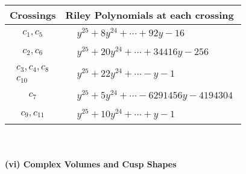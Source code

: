 \documentclass[1p]{elsarticle_modified}
\theoremstyle{definition}
\begin{document}
\begin{tabular}{m{50pt}|m{274pt}}
Crossings & \hspace{64pt}Riley Polynomials at each crossing \\
\hline $$\begin{aligned}c_{1},c_{5}\end{aligned}$$&$\begin{aligned}
&y^{25}+8 y^{24}+\cdots+92 y-16
\end{aligned}$\\
\hline $$\begin{aligned}c_{2},c_{6}\end{aligned}$$&$\begin{aligned}
&y^{25}+20 y^{24}+\cdots+34416 y-256
\end{aligned}$\\
\hline $$\begin{aligned}c_{3},c_{4},c_{8}\\c_{10}\end{aligned}$$&$\begin{aligned}
&y^{25}+22 y^{24}+\cdots- y-1
\end{aligned}$\\
\hline $$\begin{aligned}c_{7}\end{aligned}$$&$\begin{aligned}
&y^{25}+5 y^{24}+\cdots-6291456 y-4194304
\end{aligned}$\\
\hline $$\begin{aligned}c_{9},c_{11}\end{aligned}$$&$\begin{aligned}
&y^{25}+10 y^{24}+\cdots+y-1
\end{aligned}$\\
\hline
\end{tabular}\\~\\
\newpage\flushleft \textbf{(vi) Complex Volumes and Cusp Shapes}
\end{document}
